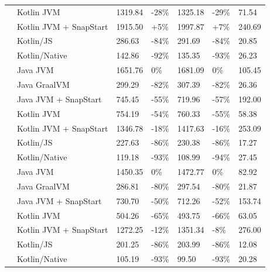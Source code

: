 \begin{table}[h!]
\begin{tabular}{|>{\centering\arraybackslash}m{1.5cm}|l|p{1.5cm}|p{1.5cm}|p{1.5cm}|p{1.5cm}|p{1.5cm}|}
 & Kotlin JVM & 1319.84 & \mbox{-28\%} & 1325.18 & \mbox{-29\%} & 71.54 \\
 & Kotlin JVM + SnapStart & 1915.50 & \mbox{+5\%} & 1997.87 & \mbox{+7\%} & 240.69 \\
 & Kotlin/JS & 286.63 & \mbox{-84\%} & 291.69 & \mbox{-84\%} & 20.85 \\
 & Kotlin/Native & 142.86 & \mbox{-92\%} & 135.35 & \mbox{-93\%} & 26.23 \\
\midrule
\multirow{7}{*}{1024} & Java JVM & 1651.76 & \mbox{0\%} & 1681.09 & \mbox{0\%} & 105.45 \\
 & Java GraalVM & 299.29 & \mbox{-82\%} & 307.39 & \mbox{-82\%} & 26.36 \\
 & Java JVM + SnapStart & 745.45 & \mbox{-55\%} & 719.96 & \mbox{-57\%} & 192.00 \\
 & Kotlin JVM & 754.19 & \mbox{-54\%} & 760.33 & \mbox{-55\%} & 58.38 \\
 & Kotlin JVM + SnapStart & 1346.78 & \mbox{-18\%} & 1417.63 & \mbox{-16\%} & 253.09 \\
 & Kotlin/JS & 227.63 & \mbox{-86\%} & 230.38 & \mbox{-86\%} & 17.27 \\
 & Kotlin/Native & 119.18 & \mbox{-93\%} & 108.99 & \mbox{-94\%} & 27.45 \\
\midrule
\multirow{7}{*}{2048} & Java JVM & 1450.35 & \mbox{0\%} & 1472.77 & \mbox{0\%} & 82.92 \\
 & Java GraalVM & 286.81 & \mbox{-80\%} & 297.54 & \mbox{-80\%} & 21.87 \\
 & Java JVM + SnapStart & 730.70 & \mbox{-50\%} & 712.26 & \mbox{-52\%} & 153.74 \\
 & Kotlin JVM & 504.26 & \mbox{-65\%} & 493.75 & \mbox{-66\%} & 63.05 \\
 & Kotlin JVM + SnapStart & 1272.25 & \mbox{-12\%} & 1351.34 & \mbox{-8\%} & 276.00 \\
 & Kotlin/JS & 201.25 & \mbox{-86\%} & 203.99 & \mbox{-86\%} & 12.08 \\
 & Kotlin/Native & 105.19 & \mbox{-93\%} & 99.50 & \mbox{-93\%} & 20.28 \\
\bottomrule
\end{tabular}
\label{table:cold_start_comparison}
\end{table}

